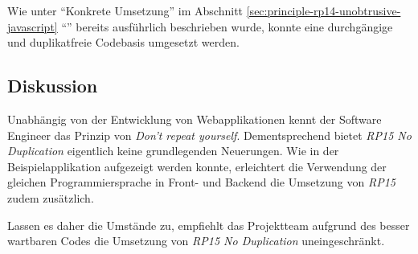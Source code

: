 Wie unter ``Konkrete Umsetzung'' im Abschnitt \ref{sec:principle-rp14-unobtrusive-javascript} ``'' bereits ausführlich beschrieben wurde, konnte eine durchgängige und duplikatfreie Codebasis umgesetzt werden.


\subsection*{Diskussion}

Unabhängig von der Entwicklung von Webapplikationen kennt der Software Engineer das Prinzip von \emph{Don't repeat yourself}. Dementsprechend bietet \emph{RP15 No Duplication} eigentlich keine grundlegenden Neuerungen. Wie in der Beispielapplikation aufgezeigt werden konnte, erleichtert die Verwendung der gleichen Programmiersprache in Front- und Backend die Umsetzung von \emph{RP15} zudem zusätzlich.

Lassen es daher die Umstände zu, empfiehlt das Projektteam aufgrund des besser wartbaren Codes die Umsetzung von \emph{RP15 No Duplication} uneingeschränkt.
